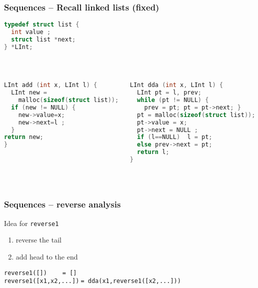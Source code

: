 \documentclass[aspectratio=169]{beamer}
\begin{document}
\begin{frame}[fragile]\frametitle{Sequences -- Recall linked lists (fixed)}
  
\begin{lstlisting}[language=C,emph={list,LInt}]
typedef struct list {
  int value ;
  struct list *next;
} *LInt;
\end{lstlisting}
~\\[-7mm]
\begin{columns}
\begin{column}{.48\textwidth}
\begin{lstlisting}[language=C, emph={prev,LInt},morekeywords={malloc}]
LInt add (int x, LInt l) {
  LInt new =
    malloc(sizeof(struct list));
  if (new != NULL) {
    new->value=x;
    new->next=l ;
  }
return new;
}
\end{lstlisting}
%
\end{column}
\begin{column}{.50\textwidth}
%
\begin{lstlisting}[language=C, emph={prev,LInt},morekeywords={malloc}]
LInt dda (int x, LInt l) {
  LInt pt = l, prev;
  while (pt != NULL) {
    prev = pt; pt = pt->next; }
  pt = malloc(sizeof(struct list));
  pt->value = x;
  pt->next = NULL ;
  if (l==NULL)  l = pt;
  else prev->next = pt;
  return l;
}
\end{lstlisting}
%
\end{column}
\end{columns}

~\\[-6mm]
\end{frame}

\begin{frame}[t]\frametitle{Sequences -- reverse analysis}

  \begin{block}{Idea for \texttt{reverse1}}
    \begin{enumerate}
      \item reverse the tail
      \item add head to the end
    \end{enumerate}
      \texttt{reverse1([])$~~~~~~~~~~$= []}
    \\\texttt{reverse1([x1,x2,...])$~$= dda(x1,reverse1([x2,...]))}
  \end{block}

\end{frame}
\end{document}
